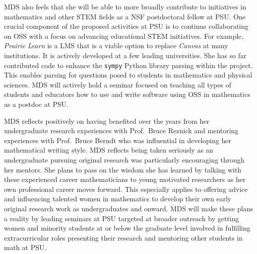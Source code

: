 \documentclass[10pt,reqno,letterpaper]{article}
\theoremstyle{plain}
\numberwithin{theorem}{section}
\theoremstyle{definition}
\begin{document}
MDS also feels that she will be able to more broadly contribute 
to initiatives in mathematics and other STEM fields as a 
NSF postdoctoral fellow at PSU.
One crucial component of the proposed activities at PSU is to continue collaborating on 
OSS with a focus on advancing educational STEM initiatives.  
For example, \emph{Prairie Learn} is a LMS that is a viable option to replace \textit{Canvas} at many 
institutions. It is actively developed at a few leading universities. 
She has so far contributed code to enhance 
the \texttt{sympy} Python library parsing within the project. This enables 
parsing for questions posed to students in mathematics and physical sciences. 
MDS will actively hold a seminar focused on teaching all types of students and educators how to use and 
write software using OSS in mathematics as a postdoc at PSU. 


MDS reflects positively on having benefited over the years from her undergraduate research experiences 
with Prof.~Bruce Reznick and 
mentoring experiences with Prof.~Bruce Berndt who was influential in 
developing her mathematical writing style.
MDS reflects being taken seriously as an 
undergraduate pursuing original research was particularly encouraging through 
her mentors. She plans to pass on the wisdom she has learned
by talking with these experienced career mathematicians to young motivated researchers as her 
own professional career moves forward. This especially applies to offering advice and 
influencing talented women in mathematics to develop their own early original 
research work as undergraduates and onward. 
MDS will make these plans a reality by leading seminars at PSU targeted at broader outreach by getting 
women and minority students at or below the graduate level involved in fulfilling extracurricular roles 
presenting their research and mentoring other students in math at PSU. 
\end{document}
